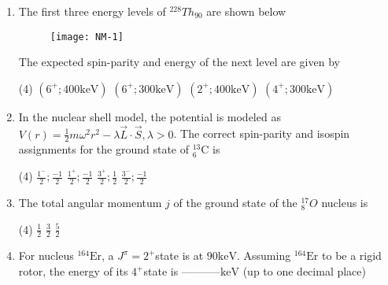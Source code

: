 \begin{enumerate}
\begin{tasks}
\end{tasks}
	\item The first three energy levels of ${ }^{228} T h_{90}$ are shown below
	\begin{figure}[H]
		\centering
		\texttt{[image: NM-1]}
		\caption{}
		\label{}
	\end{figure}
	The expected spin-parity and energy of the next level are given by
	{}
 \begin{tasks}(4)
	\task[\textbf{a.}]$\left(6^{+} ; 400 \mathrm{keV}\right)$
	\task[\textbf{b.}]$\left(6^{+} ; 300 \mathrm{keV}\right)$
	\task[\textbf{c.}]$\left(2^{+} ; 400 \mathrm{keV}\right)$
	\task[\textbf{d.}] $\left(4^{+} ; 300 \mathrm{keV}\right)$
\end{tasks}
	\item  In the nuclear shell model, the potential is modeled as $V(r)=\frac{1}{2} m \omega^2 r^2-\lambda \vec{L} \cdot \vec{S}, \lambda>0$. The correct spin-parity and isospin assignments for the ground state of ${ }_6^{13} \mathrm{C}$ is
	{}
 \begin{tasks}(4)
	\task[\textbf{a.}]$\frac{1^{-}}{2} ; \frac{-1}{2}$
	\task[\textbf{b.}]$\frac{1^{+}}{2} ; \frac{-1}{2}$
	\task[\textbf{c.}]$\frac{3^{+}}{2} ; \frac{1}{2}$
	\task[\textbf{d.}] $\frac{3^{-}}{2} ; \frac{-1}{2}$
\end{tasks}
	\item  The total angular momentum $j$ of the ground state of the ${ }_8^{17} O$ nucleus is
	{}
 \begin{tasks}(4)
	\task[\textbf{a.}]$\frac{1}{2}$
	\task[\textbf{c.}]$\frac{3}{2}$
	\task[\textbf{d.}]$\frac{5}{2}$ 
\end{tasks}
	\item  For nucleus ${ }^{164} \mathrm{Er}$, a $J^\pi=2^{+}$state is at $90 \mathrm{keV}$. Assuming ${ }^{164} \mathrm{Er}$ to be a rigid rotor, the energy of its $4^{+}$state is -----------$\mathrm{keV}$ (up to one decimal place)
{}
\end{enumerate}
\setlength\arrayrulewidth{1pt}
